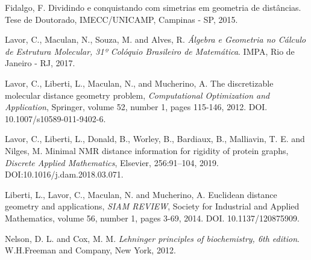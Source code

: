\documentclass[a4,11pt]{pssbmac}
\begin{document}
	\begin{thebibliography}{00}
		
		Fidalgo, F. Dividindo e conquistando com simetrias em geometria de distâncias. Tese de Doutorado, IMECC/UNICAMP, Campinas - SP, 2015.
		
		Lavor, C., Maculan, N., Souza, M. and Alves, R. {\it Álgebra e Geometria no Cálculo de Estrutura Molecular, 31º Colóquio Brasileiro de Matemática}. IMPA, Rio de Janeiro - RJ, 2017.
		
		Lavor, C., Liberti, L., Maculan, N., and Mucherino, A. The discretizable molecular distance geometry problem, {\it Computational Optimization and Application}, Springer,  volume 52, number 1, pages 115-146, 2012. DOI. 10.1007/s10589-011-9402-6.
		
		Lavor, C., Liberti, L., Donald, B., Worley, B., Bardiaux, B., Malliavin, T. E. and Nilges, M. Minimal NMR distance information for rigidity of protein graphs, {\it Discrete Applied Mathematics}, Elsevier, 256:91--104, 2019. DOI:10.1016/j.dam.2018.03.071.
		
		Liberti, L., Lavor, C., Maculan, N. and Mucherino, A. Euclidean distance geometry and applications, {\it SIAM REVIEW}, Society for Industrial and Applied Mathematics,  volume 56, number 1, pages 3-69, 2014. DOI. 10.1137/120875909.
		
		Nelson, D. L. and Cox, M. M. {\it Lehninger principles of biochemistry, 6th edition}.  W.H.Freeman and Company, New York, 2012.
		
		
		

\end{thebibliography}
\end{document}
